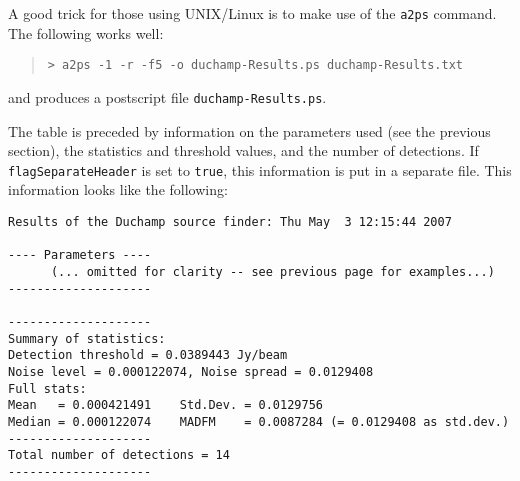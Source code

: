 A good trick for those using UNIX/Linux is to make use of the
\texttt{a2ps} command. The following works well:
\begin{quote}
{\footnotesize
\texttt{> a2ps -1 -r -f5 -o duchamp-Results.ps duchamp-Results.txt}
}
\end{quote}
and produces a postscript file \texttt{duchamp-Results.ps}.

The table is preceded by information on the parameters used (see the
previous section), the statistics and threshold values, and the number
of detections. If \texttt{flagSeparateHeader} is set to \texttt{true},
this information is put in a separate file. This information looks
like the following:

{\footnotesize
\begin{verbatim}
Results of the Duchamp source finder: Thu May  3 12:15:44 2007

---- Parameters ----
      (... omitted for clarity -- see previous page for examples...)
--------------------

--------------------
Summary of statistics:
Detection threshold = 0.0389443 Jy/beam
Noise level = 0.000122074, Noise spread = 0.0129408
Full stats:
Mean   = 0.000421491    Std.Dev. = 0.0129756
Median = 0.000122074    MADFM    = 0.0087284 (= 0.0129408 as std.dev.)
--------------------
Total number of detections = 14
--------------------
\end{verbatim}
}

